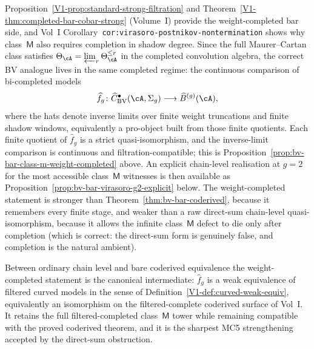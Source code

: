 \begin{remark}
Proposition~\ref{V1-prop:standard-strong-filtration} and
Theorem~\ref{V1-thm:completed-bar-cobar-strong} \textup{(}Volume~I\textup{)}
provide the weight-completed bar side, and
Vol~I Corollary~\texttt{cor:virasoro-postnikov-nontermination} shows why
class~$\mathsf{M}$ also requires completion in shadow degree. Since the
full Maurer--Cartan class satisfies
$\Theta_\cA = \varprojlim_r \Theta_\cA^{\le r}$ in the completed
convolution algebra, the correct BV analogue lives in the same
completed regime: the continuous comparison of bi-completed models
\[
\widehat f_g \colon
\widehat C^{\bullet}_{\mathrm{BV}}(\cA,\Sigma_g)
\longrightarrow
\widehat B^{(g)}(\cA),
\]
where the hats denote inverse limits over finite weight truncations
and finite shadow windows, equivalently a pro-object built from those
finite quotients. Each finite quotient of $\widehat f_g$ is a strict
quasi-isomorphism, and the inverse-limit comparison is continuous and
filtration-compatible; this is
Proposition~\ref{prop:bv-bar-class-m-weight-completed} above. An
explicit chain-level realisation at $g = 2$ for the most accessible
class~$\mathsf{M}$ witnesses is then available as
Proposition~\ref{prop:bv-bar-virasoro-g2-explicit} below. The
weight-completed statement is stronger than
Theorem~\ref{thm:bv-bar-coderived}, because it remembers every finite
stage, and weaker than a raw direct-sum chain-level quasi-isomorphism,
because it allows the infinite class~$\mathsf{M}$ defect to die only
after completion \textup{(}which is correct: the direct-sum form is
genuinely false, and completion is the natural ambient\textup{)}.

Between ordinary chain level and bare coderived equivalence the
weight-completed statement is the canonical intermediate: $\widehat f_g$
is a weak equivalence of filtered curved models in the sense of
Definition~\ref{V1-def:curved-weak-equiv}, equivalently an isomorphism
on the filtered-complete coderived surface of Vol~I. It retains the full
filtered-completed class~$\mathsf{M}$ tower while remaining compatible
with the proved coderived theorem, and it is the sharpest MC5
strengthening accepted by the direct-sum obstruction.
\end{remark}

